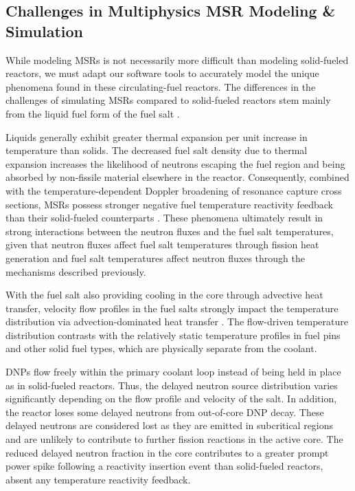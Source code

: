 \subsection{Challenges in Multiphysics \gls{MSR} Modeling \& Simulation}

While modeling \glspl{MSR} is not necessarily more difficult than modeling
solid-fueled reactors, we must adapt our software tools to accurately model the
unique phenomena found in these circulating-fuel reactors. The differences in
the challenges of simulating \glspl{MSR} compared to solid-fueled reactors stem
mainly from the liquid fuel form of the fuel salt \cite{diamond_phenomena_2018,
huff_identifying_2019}.

Liquids generally exhibit greater thermal expansion per unit increase in temperature than solids.
The decreased fuel salt density due to thermal expansion
increases the likelihood of neutrons escaping the fuel region
and being absorbed by non-fissile material elsewhere in the reactor.
Consequently, combined with the temperature-dependent Doppler broadening of
resonance capture cross sections, \glspl{MSR} possess stronger negative fuel
temperature reactivity feedback than their solid-fueled counterparts
\cite{elsheikh_safety_2013}. These
phenomena ultimately result in strong interactions between the neutron fluxes
and the fuel salt temperatures, given that neutron fluxes affect fuel salt temperatures
through fission heat generation and fuel salt temperatures affect neutron
fluxes through the mechanisms described previously.

With the fuel salt also providing cooling in the core through advective heat
transfer, velocity flow
profiles in the fuel salts strongly impact the temperature distribution via
advection-dominated heat transfer \cite{diamond_phenomena_2018}. The flow-driven
temperature distribution contrasts
with the relatively static temperature profiles in fuel pins and
other solid fuel types, which are physically separate from the coolant.

\Glspl{DNP} flow freely within the primary coolant loop instead of
being held in place as in solid-fueled reactors. Thus, the delayed neutron
source distribution varies significantly depending on the flow profile and
velocity of the salt. In addition, the reactor loses some delayed neutrons from out-of-core
\gls{DNP} decay. These delayed neutrons are considered lost as they are emitted
in subcritical regions and are unlikely to contribute to further fission
reactions in the active core. The reduced delayed neutron fraction in the core
contributes to a greater prompt power spike following a reactivity insertion
event than solid-fueled reactors, absent any temperature reactivity
feedback.

